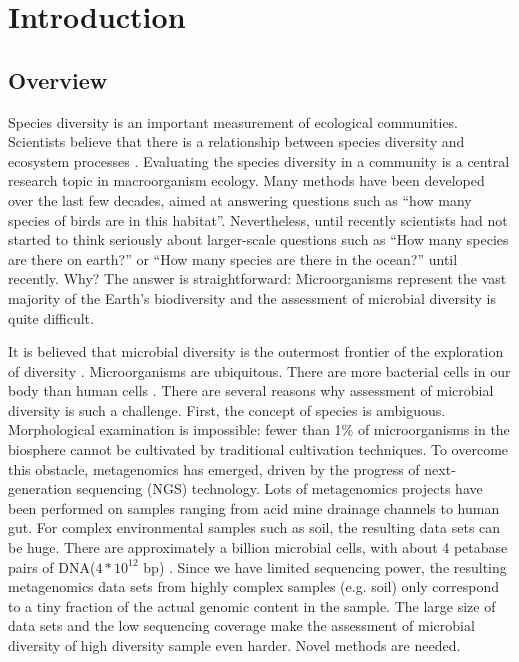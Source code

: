 \chapter{Introduction}

\section{Overview} Species diversity is an important measurement of ecological
communities. Scientists believe that there is a relationship between species
diversity and ecosystem processes \cite{Loreau:2001aa}. Evaluating the species
diversity in a community is a central research topic in macroorganism ecology.
Many methods have been developed over the last few decades, aimed at answering
questions such as ``how many species of birds are in this habitat''.
Nevertheless, until recently scientists had not started to think seriously
about larger-scale questions such as ``How many species are there on earth?''
\cite{May:1988aa} or ``How many species are there in the ocean?''
\cite{Mora:2011aa} until recently. Why? The answer is straightforward:
Microorganisms represent the vast majority of the Earth's biodiversity and the
assessment of microbial diversity is quite difficult.

It is believed that microbial diversity is the outermost frontier of the
exploration of diversity \cite{magurran2011biological}. Microorganisms are
ubiquitous. There are more
bacterial cells in our body than human cells \cite{Savage:1977aa}. 
There are several reasons why assessment of microbial diversity is such a
challenge. First, the concept of species is ambiguous. Morphological
examination is impossible: fewer than 1\% of microorganisms in the biosphere
cannot be cultivated by traditional cultivation
techniques\cite{Curtis:2002aa}. To overcome this obstacle, metagenomics has
emerged, driven by the progress of next-generation sequencing (NGS) technology.
Lots of metagenomics projects have been performed on samples ranging from acid
mine drainage channels to human gut. For complex environmental samples such as
soil, the resulting data sets can be huge. There are approximately a billion
microbial cells, with about 4 petabase pairs of DNA($4*{10}^{12}$ bp)
\cite{Zarraonaindia:2013aa}. Since we have limited sequencing power, the
resulting metagenomics data sets from highly complex samples (e.g. soil) only
correspond to a tiny fraction of the actual genomic content in the sample. The
large size of data sets and the low sequencing coverage make the assessment of
microbial diversity of high diversity sample even harder. Novel methods are
needed.


